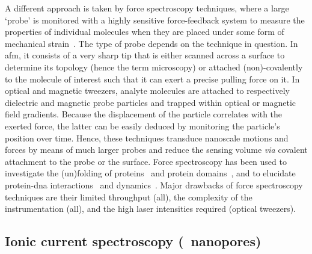 A different approach is taken by force spectroscopy techniques, where a large `probe' is monitored with a
highly sensitive force-feedback system to measure the properties of individual molecules when they are placed
under some form of mechanical strain~\cite{Neuman-2008}. The type of probe depends on the technique in
question. In \gls{afm}, it consists of a very sharp tip that is either scanned across a surface to determine
its topology (hence the term microscopy) or attached (non)-covalently to the molecule of interest such that
it can exert a precise pulling force on it. In optical and magnetic tweezers, analyte molecules are attached
to respectively dielectric and magnetic probe particles and trapped within optical or magnetic field
gradients. Because the displacement of the particle correlates with the exerted force, the latter can be
easily deduced by monitoring the particle's position over time. Hence, these techniques transduce nanoscale
motions and forces by means of much larger probes and reduce the sensing volume \textit{via} covalent
attachment to the probe or the surface. Force spectroscopy has been used to investigate the (un)folding of
proteins~\cite{Bustamante-2020,Jagannathan-2013} and protein domains~\cite{Rief-1997,Kellermayer-1997}, and to
elucidate protein-\gls{dna} interactions~\cite{Abbondanzieri-2005,Shlyakhtenko-2007,Vanderlinden-2019} and
dynamics~\cite{Lyubchenko-2018,Brouns-2018}. Major drawbacks of force spectroscopy techniques are their
limited throughput (all), the complexity of the instrumentation (all), and the high laser intensities required
(optical tweezers).


\subsection{Ionic current spectroscopy (\ie~nanopores)}
%


